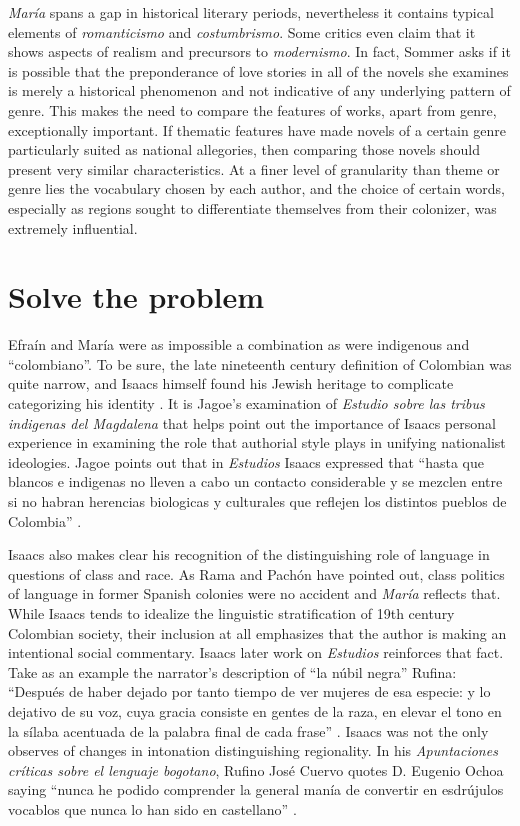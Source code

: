 \documentclass[12pt]{report}
\begin{document}
\textit{María} spans a gap in historical literary periods, nevertheless it contains typical elements of \textit{romanticismo} and \textit{costumbrismo}.
Some critics even claim that it shows aspects of realism and precursors to \textit{modernismo}.
In fact, Sommer asks if it is possible that the preponderance of love stories in all of the novels she examines is merely a historical phenomenon and not indicative of any underlying pattern of genre.
This makes the need to compare the features of works, apart from genre, exceptionally important.
If thematic features have made novels of a certain genre particularly suited as national allegories, then comparing those novels should present very similar characteristics.
At a finer level of granularity than theme or genre lies the vocabulary chosen by each author, and the choice of certain words, especially as regions sought to differentiate themselves from their colonizer, was extremely influential.


\section{Solve the problem}

Efraín and María were as impossible a combination as were indigenous and \enquote{colombiano}.
To be sure, the late nineteenth century definition of Colombian was quite narrow, and Isaacs himself found his Jewish heritage to complicate categorizing his identity \autocite[160]{Jagoe2003}.
It is Jagoe's examination of \textit{Estudio sobre las tribus indigenas del Magdalena} that helps point out the importance of Isaacs personal experience in examining the role that authorial style plays in unifying nationalist ideologies. 
Jagoe points out that in \textit{Estudios} Isaacs expressed that \enquote{hasta que blancos e indigenas no lleven a cabo un contacto considerable y se mezclen entre si no habran herencias biologicas y culturales que reflejen los distintos pueblos de Colombia} \autocite[160]{Jagoe2003}.


Isaacs also makes clear his recognition of the distinguishing role of language in questions of class and race.
As Rama and Pachón have pointed out, class politics of language in former Spanish colonies were no accident and \textit{María} reflects that.
While Isaacs tends to idealize the linguistic stratification of 19th century Colombian society, their inclusion at all emphasizes that the author is making an intentional social commentary.
Isaacs later work on \textit{Estudios} reinforces that fact.
Take as an example the narrator's description of \enquote{la núbil negra} Rufina:
\enquote{Después de haber dejado por tanto tiempo de ver mujeres de esa especie: y lo dejativo de su voz, cuya gracia consiste en gentes de la raza, en elevar el tono en la sílaba acentuada de la palabra final de cada frase} \autocite[304]{Isaacs2012}.
Isaacs was not the only observes of changes in intonation distinguishing regionality.
In his \textit{Apuntaciones críticas sobre el lenguaje bogotano}, Rufino José Cuervo quotes D. Eugenio Ochoa saying \enquote{nunca he podido comprender la general manía de convertir en esdrújulos vocablos que nunca lo han sido en castellano} \autocite[3]{Cuervo1876}.
\end{document}

